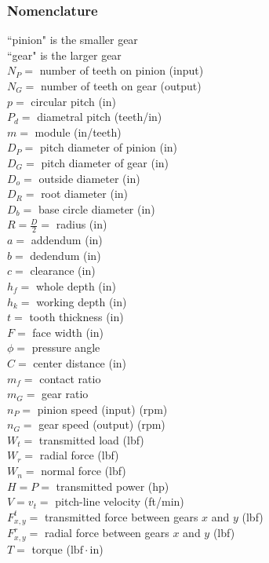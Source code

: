 \documentclass[11pt, fleqn]{article}
\begin{document}
\subsubsection{Nomenclature}
``pinion" is the smaller gear\\
``gear" is the larger gear\\
$N_P=$ number of teeth on pinion (input)\\
$N_G=$ number of teeth on gear (output)\\
$p=$ circular pitch (in)\\
$P_d=$ diametral pitch (teeth/in)\\
$m=$ module (in/teeth)\\
$D_P=$ pitch diameter of pinion (in)\\
$D_G=$ pitch diameter of gear (in)\\
$D_o=$ outside diameter (in)\\
$D_R=$ root diameter (in)\\
$D_b=$ base circle diameter (in)\\
$R=\frac{D}{2}=$ radius (in)\\
$a=$ addendum (in)\\
$b=$ dedendum (in)\\
$c=$ clearance (in)\\
$h_f=$ whole depth (in)\\
$h_k=$ working depth (in)\\
$t=$ tooth thickness (in)\\
$F=$ face width (in)\\
$\phi=$ pressure angle\\
$C=$ center distance (in)\\
$m_f=$ contact ratio\\
$m_G=$ gear ratio\\
$n_P=$ pinion speed (input) (rpm)\\
$n_G=$ gear speed (output) (rpm)\\
$W_t=$ transmitted load (lbf)\\
$W_r=$ radial force (lbf)\\
$W_n=$ normal force (lbf)\\
$H=P=$ transmitted power (hp)\\
$V=v_t=$ pitch-line velocity (ft/min)\\
$F_{x,y}^t=$ transmitted force between gears $x$ and $y$ (lbf)\\
$F_{x,y}^r=$ radial force between gears $x$ and $y$ (lbf)\\
$T=$ torque ($\mathrm{lbf\cdot in}$)\\
\end{document}
